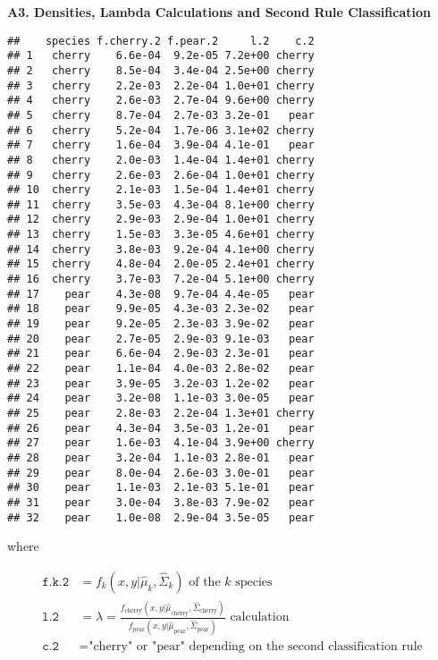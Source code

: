 \documentclass[]{article}
\begin{document}
\newpage

\textbf{A3. Densities, Lambda Calculations and Second Rule Classification}

\begin{verbatim}
##    species f.cherry.2 f.pear.2     l.2    c.2
## 1   cherry    6.6e-04  9.2e-05 7.2e+00 cherry
## 2   cherry    8.5e-04  3.4e-04 2.5e+00 cherry
## 3   cherry    2.2e-03  2.2e-04 1.0e+01 cherry
## 4   cherry    2.6e-03  2.7e-04 9.6e+00 cherry
## 5   cherry    8.7e-04  2.7e-03 3.2e-01   pear
## 6   cherry    5.2e-04  1.7e-06 3.1e+02 cherry
## 7   cherry    1.6e-04  3.9e-04 4.1e-01   pear
## 8   cherry    2.0e-03  1.4e-04 1.4e+01 cherry
## 9   cherry    2.6e-03  2.6e-04 1.0e+01 cherry
## 10  cherry    2.1e-03  1.5e-04 1.4e+01 cherry
## 11  cherry    3.5e-03  4.3e-04 8.1e+00 cherry
## 12  cherry    2.9e-03  2.9e-04 1.0e+01 cherry
## 13  cherry    1.5e-03  3.3e-05 4.6e+01 cherry
## 14  cherry    3.8e-03  9.2e-04 4.1e+00 cherry
## 15  cherry    4.8e-04  2.0e-05 2.4e+01 cherry
## 16  cherry    3.7e-03  7.2e-04 5.1e+00 cherry
## 17    pear    4.3e-08  9.7e-04 4.4e-05   pear
## 18    pear    9.9e-05  4.3e-03 2.3e-02   pear
## 19    pear    9.2e-05  2.3e-03 3.9e-02   pear
## 20    pear    2.7e-05  2.9e-03 9.1e-03   pear
## 21    pear    6.6e-04  2.9e-03 2.3e-01   pear
## 22    pear    1.1e-04  4.0e-03 2.8e-02   pear
## 23    pear    3.9e-05  3.2e-03 1.2e-02   pear
## 24    pear    3.2e-08  1.1e-03 3.0e-05   pear
## 25    pear    2.8e-03  2.2e-04 1.3e+01 cherry
## 26    pear    4.3e-04  3.5e-03 1.2e-01   pear
## 27    pear    1.6e-03  4.1e-04 3.9e+00 cherry
## 28    pear    3.2e-04  1.1e-03 2.8e-01   pear
## 29    pear    8.0e-04  2.6e-03 3.0e-01   pear
## 30    pear    1.1e-03  2.1e-03 5.1e-01   pear
## 31    pear    3.0e-04  3.8e-03 7.9e-02   pear
## 32    pear    1.0e-08  2.9e-04 3.5e-05   pear
\end{verbatim}

where

\begin{align*}
\texttt{f.k.2} &= \text{$f_k(x,y|\hat{\mu}_{k}, \hat{\Sigma}_{k})$ of the $k$ species} \\
\texttt{l.2} &= \text{$\lambda = \frac{f_{\text{cherry}}(x,y|\hat{\mu}_{\text{cherry}}, \hat{\Sigma}_{\text{cherry}})}{f_{\text{pear}} (x,y|\hat{\mu}_{\text{pear}}, \hat{\Sigma}_{\text{pear}})}$ calculation} \\
\texttt{c.2} &= \text{"cherry" or "pear" depending on the second classification rule} \\
\end{align*}
\end{document}
